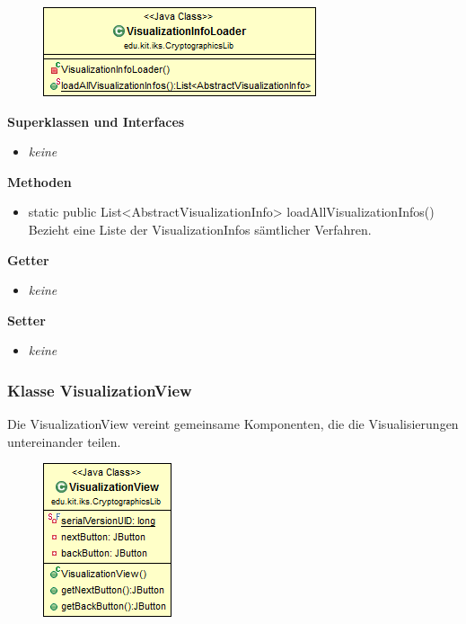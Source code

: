 \documentclass{article}
\begin{document}
      \begin{figure}[H]
        \centering
        \includegraphics{resources/edu-kit-iks-CryptographicsLib-VisualizationInfoLoader}
      \end{figure}
	
      \textbf{Superklassen und Interfaces}
      \begin{itemize}
        \item \textit{keine}
      \end{itemize}
	
      \textbf{Methoden}
      \begin{itemize}
        \item static public List<AbstractVisualizationInfo> loadAllVisualizationInfos() \newline
          Bezieht eine Liste der VisualizationInfos sämtlicher Verfahren.
      \end{itemize}
      
      \textbf{Getter}
      \begin{itemize}
		\item \textit{keine}
      \end{itemize}
      
      \textbf{Setter}
      \begin{itemize}
        \item \textit{keine}
      \end{itemize}
	
	\subsubsection{Klasse VisualizationView}
	  Die VisualizationView vereint gemeinsame Komponenten, die die Visualisierungen
	  untereinander teilen.
	
      \begin{figure}[H]
        \centering
        \includegraphics{resources/edu-kit-iks-CryptographicsLib-VisualizationView}
      \end{figure}
	
\end{document}
